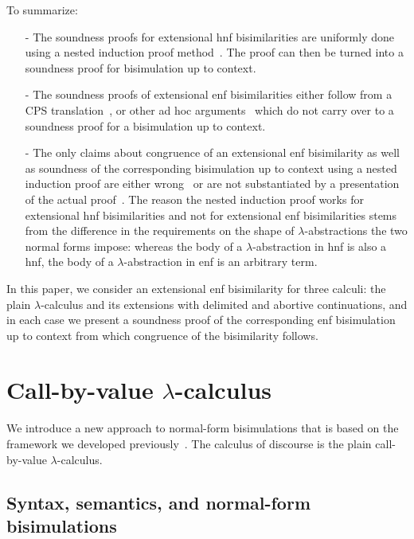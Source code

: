 \documentclass{lmcs}
\theoremstyle{defC}
\begin{document}
To summarize:
\begin{itemize}
\item[-] The soundness proofs for extensional hnf bisimilarities are uniformly
  done using a nested induction proof
  method~\cite{Lassen:MFPS99,Lassen:LICS06}. The proof can then be turned into a
  soundness proof for bisimulation up to context.
\item[-] The soundness proofs of extensional enf bisimilarities either follow
  from a CPS translation~\cite{Lassen:LICS05,Lassen:LICS06}, or other ad hoc
  arguments~\cite{Stoevring-Lassen:POPL07,Lassen-Levy:CSL07,Lassen-Levy:LICS08,
    Biernacki-al:HAL15} which do not carry over to a soundness proof for a
  bisimulation up to context.
\item[-] The only claims about congruence of an extensional enf bisimilarity as
  well as soundness of the corresponding bisimulation up to context using a
  nested induction proof are either wrong~\cite{Biernacki-Lenglet:FLOPS12} or
  are not substantiated by a presentation of the actual
  proof~\cite{Lassen:LICS05}. The reason the nested induction proof works for
  extensional hnf bisimilarities and not for extensional enf bisimilarities
  stems from the difference in the requirements on the shape of
  $\lambda$-abstractions the two normal forms impose: whereas the body of a
  $\lambda$-abstraction in hnf is also a hnf, the body of a
  $\lambda$-abstraction in enf is an arbitrary term.
\end{itemize}
In this paper, we consider an extensional enf bisimilarity for three calculi:
the plain $\lambda$-calculus and its extensions with delimited and abortive
continuations, and in each case we present a soundness proof of the
corresponding enf bisimulation up to context from which congruence of the
bisimilarity follows.

\section{Call-by-value \texorpdfstring{$\lambda$}{lambda}-calculus}%
\label{s:lamcal}

We introduce a new approach to normal-form bisimulations that is based on the
framework we developed previously~\cite{Aristizabal-al:FSCD16}. The calculus of
discourse is the plain call-by-value $\lambda$-calculus.

\subsection{Syntax, semantics, and normal-form bisimulations}%
\label{ss:lamcal-calculus}
\end{document}
